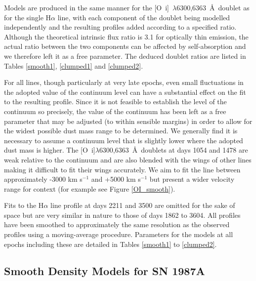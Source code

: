 \documentclass[useAMS,usenatbib,usegraphicx]{mnras}
\begin{document}
Models are produced in the same manner for the 
[O~{\sc i}]~$\lambda$6300,6363~\AA\ doublet as for the single H$\alpha$ line, with each component 
of the doublet being modelled independently and the resulting profiles 
added according to a specified ratio.  Although the theoretical intrinsic flux ratio 
is 3.1 for optically thin emission, the actual ratio between the two components can be 
affected by self-absorption \citep{Li1992} and we therefore 
left it as a free parameter.  The deduced doublet ratios are listed in Tables \ref{smooth1}, \ref{clumped1} and \ref{clumped2}.  

For all lines, though particularly at very late epochs, even small fluctuations in the adopted value of the 
continuum level can have a substantial effect on the fit to the resulting 
profile.  Since it is not feasible to establish the level of the continuum 
so precisely, the value of the continuum has been left as a free parameter 
that may be adjusted (to within sensible margins) in order to allow for 
the widest possible dust mass range to be determined.  We generally find 
it is necessary to assume a continuum level that is slightly lower where 
the adopted dust mass is higher.  The [O~{\sc i}]$\lambda$6300,6363~\AA\ doublets at days 1054 and 1478 are weak relative to the continuum and are also blended with the wings of other lines making it difficult to fit their wings accurately.  We aim to fit the line between approximately -3000 km s$^{-1}$ and +5000 km s$^{-1}$ but present a wider velocity range for context (for example see Figure \ref{OI_smooth}).

Fits to the H$\alpha$ line profile at days 2211 and 3500 are omitted for the sake of space but are very similar in nature to those of days 1862 to 3604.  All profiles have been smoothed to approximately the same resolution as the observed profiles using a moving-average procedure.  Parameters for the models at all epochs including these are detailed in Tables \ref{smooth1} to \ref{clumped2}.


\subsection{Smooth Density Models for SN 1987A}
\label{smooth_models}
\end{document}
